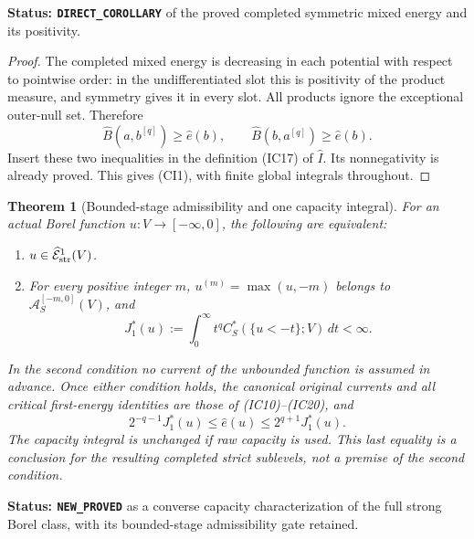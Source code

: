 \documentclass[11pt,a4paper]{article}
\numberwithin{equation}{section}
\newtheorem{theorem}{Theorem}[section]
\theoremstyle{definition}
\theoremstyle{remark}
\begin{document}
\noindent\textbf{Status: \texttt{DIRECT\_COROLLARY}} of the
proved completed symmetric mixed energy and its positivity.

\begin{proof}
The completed mixed energy is decreasing in each potential
with respect to pointwise order: in the undifferentiated
slot this is positivity of the product measure, and symmetry
gives it in every slot. All products ignore the exceptional
outer-null set. Therefore
\[
       \widehat B(a,b^{[q]})\geq\widehat e(b),\qquad
       \widehat B(b,a^{[q]})\geq\widehat e(b).
\]
Insert these two inequalities in the definition (IC17) of
$\widehat I$. Its nonnegativity is already proved. This gives
(CI1), with finite global integrals throughout.
\end{proof}

\begin{theorem}[Bounded-stage admissibility and one capacity integral]
\label{thm:r11-intrinsic-strong-first-energy}
For an actual Borel function $u:V\to[-\infty,0]$, the following
are equivalent:
\begin{enumerate}
\item $u\in\widehat{\mathcal E}^1_{\rm str}(V)$.
\item For every positive integer $m$,
$u^{(m)}=\max(u,-m)$ belongs to
$\mathcal A_S^{[-m,0]}(V)$, and
\[
                J_1^*(u):=\int_0^\infty
                       t^q C_S^*(\{u<-t\};V)\,dt<\infty.
 \tag{CI2}
\]
\end{enumerate}
In the second condition no current of the unbounded function
is assumed in advance. Once either condition holds, the
canonical original currents and all critical first-energy
identities are those of (IC10)--(IC20), and
\[
       2^{-q-1}J_1^*(u)\leq\widehat e(u)
                                  \leq2^{q+1}J_1^*(u).
 \tag{CI3}
\]
The capacity integral is unchanged if raw capacity is used.
This last equality is a conclusion for the resulting completed
strict sublevels, not a premise of the second condition.
\end{theorem}

\noindent\textbf{Status: \texttt{NEW\_PROVED}} as a converse
capacity characterization of the full strong Borel class,
with its bounded-stage admissibility gate retained.
\end{document}
